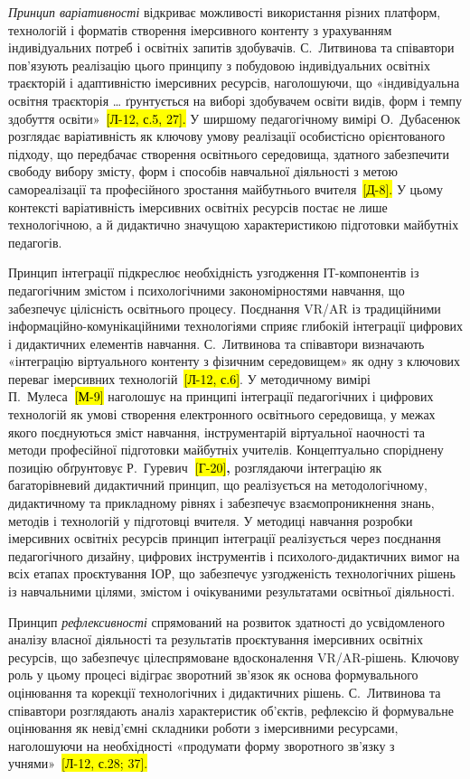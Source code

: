 \emph{Принцип варіативності} відкриває можливості використання різних платформ, технологій і форматів створення імерсивного контенту з урахуванням індивідуальних потреб і освітніх запитів здобувачів. С.~Литвинова та співавтори пов'язують реалізацію цього принципу з побудовою індивідуальних освітніх траєкторій і адаптивністю імерсивних ресурсів, наголошуючи, що «індивідуальна освітня траєкторія \ldots{} ґрунтується на виборі здобувачем освіти видів, форм і темпу здобуття освіти»~\hl{{[}Л-12, с.5, 27{]}.} У ширшому педагогічному вимірі О.~Дубасенюк розглядає варіативність як ключову умову реалізації особистісно орієнтованого підходу, що передбачає створення освітнього середовища, здатного забезпечити свободу вибору змісту, форм і способів навчальної діяльності з метою самореалізації та професійного зростання майбутнього вчителя~\hl{{[}Д-8{]}.} У цьому контексті варіативність імерсивних освітніх ресурсів постає не лише технологічною, а й дидактично значущою характеристикою підготовки майбутніх педагогів.

Принцип інтеграції підкреслює необхідність узгодження ІТ-компонентів із педагогічним змістом і психологічними закономірностями навчання, що забезпечує цілісність освітнього процесу. Поєднання VR/AR із традиційними інформаційно-комунікаційними технологіями сприяє глибокій інтеграції цифрових і дидактичних елементів навчання. С.~Литвинова та співавтори визначають «інтеграцію віртуального контенту з фізичним середовищем» як одну з ключових переваг імерсивних технологій~\hl{{[}Л-12, с.6{]}}. У методичному вимірі П.~Мулеса\textbf{~}\hl{{[}М-9{]}} наголошує на принципі інтеграції педагогічних і цифрових технологій як умові створення електронного освітнього середовища, у межах якого поєднуються зміст навчання, інструментарій віртуальної наочності та методи професійної підготовки майбутніх учителів. Концептуально споріднену позицію обґрунтовує Р.~Гуревич\textbf{~}\hl{{[}Г-20{]}}\textbf{,} розглядаючи інтеграцію як багаторівневий дидактичний принцип, що реалізується на методологічному, дидактичному та прикладному рівнях і забезпечує взаємопроникнення знань, методів і технологій у підготовці вчителя. У методиці навчання розробки імерсивних освітніх ресурсів принцип інтеграції реалізується через поєднання педагогічного дизайну, цифрових інструментів і психолого-дидактичних вимог на всіх етапах проєктування ІОР, що забезпечує узгодженість технологічних рішень із навчальними цілями, змістом і очікуваними результатами освітньої діяльності.

Принцип \emph{рефлексивності} спрямований на розвиток здатності до усвідомленого аналізу власної діяльності та результатів проєктування імерсивних освітніх ресурсів, що забезпечує цілеспрямоване вдосконалення VR/AR-рішень. Ключову роль у цьому процесі відіграє зворотний зв'язок як основа формувального оцінювання та корекції технологічних і дидактичних рішень. С.~Литвинова та співавтори розглядають аналіз характеристик об'єктів, рефлексію й формувальне оцінювання як невід'ємні складники роботи з імерсивними ресурсами, наголошуючи на необхідності «продумати форму зворотного зв'язку з учнями»~\hl{{[}Л-12, с.28; 37{]}.}


